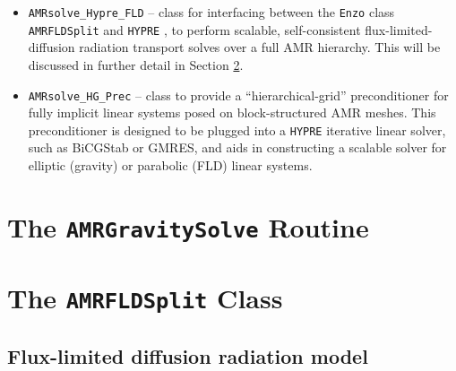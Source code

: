 \documentclass[letterpaper,10pt]{article}
\renewcommand{\(}{\left(}
\renewcommand{\)}{\right)}
\newcommand{\enzo}{{\tt Enzo} }
\newcommand{\hypre}{{\tt HYPRE} }
\begin{document}
\begin{itemize}
  \enzo routine {\tt AMRGravitySolve} and \hypre, to perform scalable,
  self-consistent self-gravity solves over a full AMR hierarchy.  This
  will be discussed in further detail in Section
  \ref{sec:AMRGravitySolve}.
\item {\tt AMRsolve\_Hypre\_FLD} -- class for interfacing between the
  \enzo class {\tt AMRFLDSplit} and \hypre, to perform scalable,
  self-consistent flux-limited-diffusion radiation transport solves
  over a full AMR hierarchy.  This will be discussed in further detail
  in Section \ref{sec:AMRFLDSplit}.
\item {\tt AMRsolve\_HG\_Prec} -- class to provide a
  ``hierarchical-grid'' preconditioner for fully implicit linear
  systems posed on block-structured AMR meshes.  This preconditioner
  is designed to be plugged into a \hypre iterative linear solver,
  such as BiCGStab or GMRES, and aids in constructing a scalable
  solver for elliptic (gravity) or parabolic (FLD) linear systems.
\end{itemize}



\section{The {\tt AMRGravitySolve} Routine}
\label{sec:AMRGravitySolve}


\section{The {\tt AMRFLDSplit} Class}
\label{sec:AMRFLDSplit}








\subsection{Flux-limited diffusion radiation model}
\label{sec:rad_model}
\end{document}
